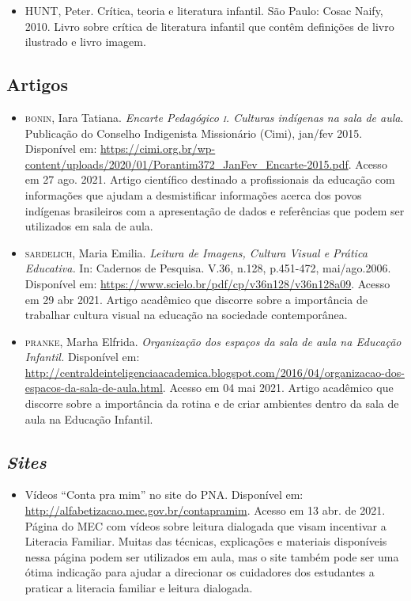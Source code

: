 \documentclass[11pt]{extarticle}
\begin{document}
{{\begin{itemize}
\item HUNT, Peter. Crítica, teoria e literatura infantil. São Paulo: Cosac Naify, 2010.
Livro sobre crítica de literatura infantil que contêm definições de livro ilustrado e livro imagem. 
\end{itemize}

\subsection{Artigos}

\begin{itemize}
	\item \textsc{bonin}, Iara Tatiana. \emph{Encarte Pedagógico \textsc{i}. Culturas indígenas na sala de aula}.
	Publicação do Conselho Indigenista Missionário (Cimi), jan/fev 2015. Disponível em: \url{https://cimi.org.br/wp-content/uploads/2020/01/Porantim372_JanFev_Encarte-2015.pdf}. Acesso em 27 ago. 2021.
	Artigo científico destinado a profissionais da educação com informações que ajudam a desmistificar informações
	acerca dos povos indígenas brasileiros com a apresentação de dados e referências que podem ser utilizados em sala de aula.
	\item \textsc{sardelich}, Maria Emilia. \emph{Leitura de Imagens, Cultura Visual e Prática Educativa.} 
In: Cadernos de Pesquisa. V.36, n.128, p.451-472, mai/ago.2006. Disponível em: \url{https://www.scielo.br/pdf/cp/v36n128/v36n128a09}. 
Acesso em 29 abr 2021. 
Artigo acadêmico que discorre sobre a importância de trabalhar cultura 
visual na educação na sociedade contemporânea. 

\item \textsc{pranke}, Marha Elfrida. \emph{Organização dos espaços da sala de aula na Educação Infantil.} Disponível em: 
\url{http://centraldeinteligenciaacademica.blogspot.com/2016/04/organizacao-dos-espacos-da-sala-de-aula.html}. Acesso em 04 mai 2021. 
Artigo acadêmico que discorre sobre a importância da rotina e de criar ambientes dentro da sala de aula na Educação Infantil.  
\end{itemize}

\subsection{\textit{Sites}}

\begin{itemize}
\item Vídeos “Conta pra mim” no site do PNA. Disponível em: \url{http://alfabetizacao.mec.gov.br/contapramim}. 
Acesso em 13 abr. de 2021.
Página do MEC com vídeos sobre leitura dialogada que visam incentivar a Literacia Familiar. Muitas das 
técnicas, explicações e materiais disponíveis nessa página podem ser utilizados em aula, mas o site também 
pode ser uma ótima indicação para ajudar a direcionar os cuidadores dos estudantes a praticar 
a literacia familiar e leitura dialogada.


\end{itemize}}}
\end{document}
